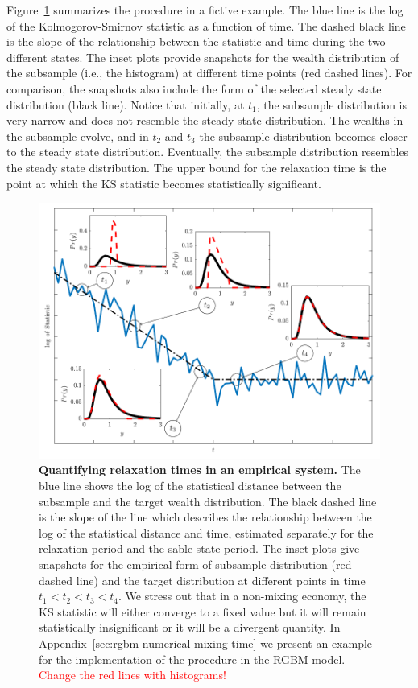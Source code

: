 \documentclass[11pt]{article}
\newcommand{\Fref}[1]{Figure~\ref{fig:#1}}
\numberwithin{equation}{section}
\begin{document}
\Fref{mixing-time} summarizes the procedure in a fictive example. The blue line is the log of the Kolmogorov-Smirnov statistic as a function of time. The dashed black line is the slope of the relationship between the statistic and time during the two different states. The inset plots provide snapshots for the wealth distribution of the subsample (i.e., the histogram) at different time points (red dashed lines). For comparison, the snapshots also include the form of the selected steady state distribution (black line). Notice that initially, at $t_1$, the subsample distribution is very narrow and does not resemble the steady state distribution. The wealths in the subsample evolve, and in $t_2$ and $t_3$ the subsample distribution becomes closer to the steady state distribution. Eventually, the subsample distribution resembles the steady state distribution. The upper bound for the relaxation time is the point at which the KS statistic becomes statistically significant. 

\begin{figure}[!htb]
\centering
\includegraphics[width=1.0\textwidth]{figs/fig_mixing_time.pdf}
\caption{\textbf{Quantifying relaxation times in an empirical system.} The blue line shows the log of the statistical distance between the subsample and the target wealth distribution. The black dashed line is the slope of the line which describes the relationship between the log of the statistical distance and time, estimated separately for the relaxation period and the sable state period. The inset plots give snapshots for the empirical form of subsample distribution (red dashed line) and the target distribution at different points in time $t_1 < t_2 < t_3 < t_4$. We stress out that in a non-mixing economy, the KS statistic will either converge to a fixed value but it will remain statistically insignificant or it will be a divergent quantity. In Appendix~\ref{sec:rgbm-numerical-mixing-time} we present an example for the implementation of the procedure in the RGBM model. \textcolor{red}{Change the red lines with histograms!}
\label{fig:mixing-time}}
\end{figure}
\FloatBarrier
\end{document}
